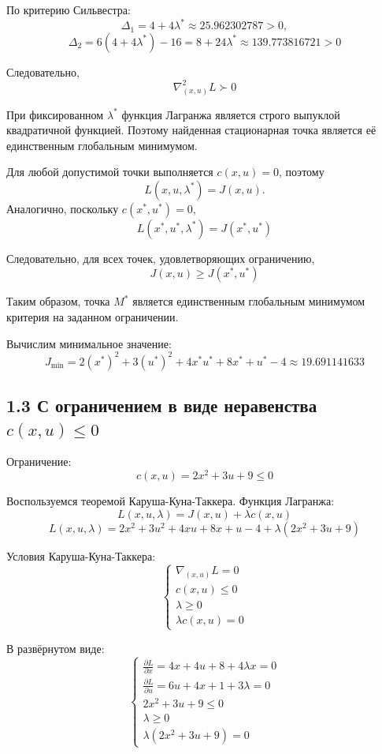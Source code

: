 По критерию Сильвестра:
\[
\Delta_1=4+4\lambda^*
\approx25.962302787>0,
\]
\[
\Delta_2=
6(4+4\lambda^*)-16
=8+24\lambda^*
\approx139.773816721>0
\]

Следовательно,
\[
\nabla^2_{(x,u)}L\succ0
\]

При фиксированном \(\lambda^*\) функция Лагранжа является
строго выпуклой квадратичной функцией. Поэтому найденная
стационарная точка является её единственным глобальным минимумом.

Для любой допустимой точки выполняется \(c(x,u)=0\), поэтому
\[
L(x,u,\lambda^*)=J(x,u).
\]
Аналогично, поскольку \(c(x^*,u^*)=0\),
\[
L(x^*,u^*,\lambda^*)=J(x^*,u^*)
\]

Следовательно, для всех точек, удовлетворяющих ограничению,
\[
J(x,u)\geq J(x^*,u^*)
\]

Таким образом, точка \(M^*\) является единственным
глобальным минимумом критерия на заданном ограничении.

Вычислим минимальное значение:
\[
J_{\min}
=2(x^*)^2+3(u^*)^2+4x^*u^*+8x^*+u^*-4
\approx19.691141633
\]

\subsection*{1.3 С ограничением в виде неравенства \(c(x,u)\leq0\)}

Ограничение:
\[
c(x,u)=2x^2+3u+9\leq0
\]

Воспользуемся теоремой Каруша-Куна-Таккера.
Функция Лагранжа:
\[
L(x,u,\lambda)=J(x,u)+\lambda c(x,u)
\]
\[
L(x,u,\lambda)
=2x^2+3u^2+4xu+8x+u-4
+\lambda(2x^2+3u+9)
\]

Условия Каруша-Куна-Таккера:
\[
\begin{cases}
\nabla_{(x,u)}L=0 \\[1ex]
c(x,u)\leq0 \\[1ex]
\lambda\geq0 \\[1ex]
\lambda c(x,u)=0
\end{cases}
\]

В развёрнутом виде:
\[
\begin{cases}
\displaystyle
\frac{\partial L}{\partial x}
=4x+4u+8+4\lambda x=0 \\[2ex]
\displaystyle
\frac{\partial L}{\partial u}
=6u+4x+1+3\lambda=0 \\[2ex]
2x^2+3u+9\leq0 \\[1ex]
\lambda\geq0 \\[1ex]
\lambda(2x^2+3u+9)=0
\end{cases}
\]

